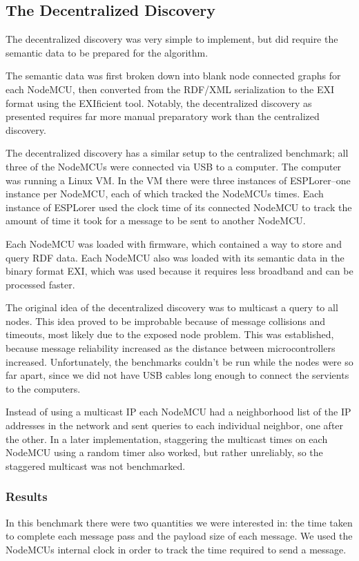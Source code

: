 \subsection{The Decentralized Discovery}
The decentralized discovery was very simple to implement, but did require the semantic data to be prepared for the algorithm.

The semantic data was first broken down into blank node connected graphs for each NodeMCU, then converted from the RDF/XML serialization to the EXI format using the EXIficient tool. Notably, the decentralized discovery as presented requires far more manual preparatory work than the centralized discovery.


The decentralized discovery has a similar setup to the centralized benchmark; all three of the NodeMCUs were connected via USB to a computer. The computer was running a Linux VM. In the VM there were three instances of ESPLorer--one instance per NodeMCU, each of which tracked the NodeMCUs times. Each instance of ESPLorer used the clock time of its connected NodeMCU to track the amount of time it took for a message to be sent to another NodeMCU.

Each NodeMCU was loaded with firmware, which contained a way to store and query RDF data. Each NodeMCU also was loaded with its semantic data in the binary format EXI, which was used because it requires less broadband and can be processed faster.

The original idea of the decentralized discovery was to multicast a query to all nodes. This idea proved to be improbable because of message collisions and timeouts, most likely due to the exposed node problem. This was established, because message reliability increased as the distance between microcontrollers increased. Unfortunately, the benchmarks couldn't be run while the nodes were so far apart, since we did not have USB cables long enough to connect the servients to the computers.

Instead of using a multicast IP each NodeMCU had a neighborhood list of the IP addresses in the network and sent queries to each individual neighbor, one after the other. In a later implementation, staggering the multicast times on each NodeMCU using a random timer also worked, but rather unreliably, so the staggered multicast was not benchmarked.


\subsubsection{Results}
In this benchmark there were two quantities we were interested in: the time taken to complete each message pass and the payload size of each message. We used the NodeMCUs internal clock in order to track the time required to send a message.

